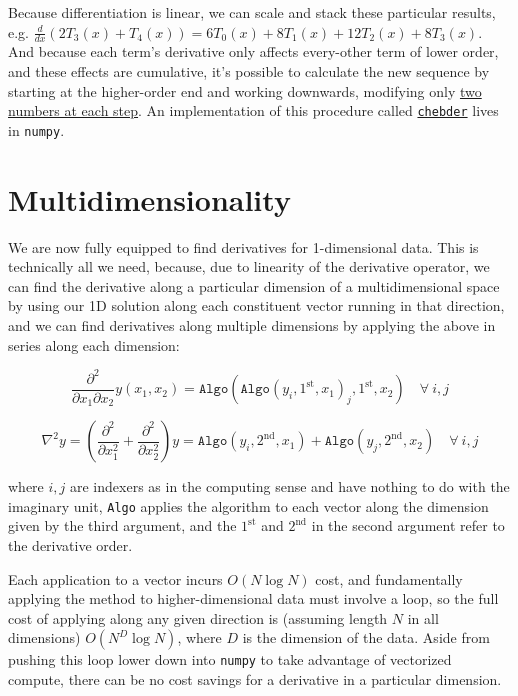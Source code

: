 \documentclass[10pt]{article}
\begin{document}
Because differentiation is linear, we can scale and stack these particular results, e.g. $\frac{d}{dx}(2T_3(x) + T_4(x)) = 6T_0(x) + 8T_1(x) + 12T_2(x) + 8T_3(x)$. And because each term's derivative only affects every-other term of lower order, and these effects are cumulative, it's possible to calculate the new sequence by starting at the higher-order end and working downwards, modifying only \href{https://scicomp.stackexchange.com/q/44939/48402}{two numbers at each step}\cite{dcoefs}. An implementation of this procedure called \href{https://github.com/numpy/numpy/blob/v2.2.0/numpy/polynomial/chebyshev.py#L874-L961}{\texttt{chebder}}\cite{chebder} lives in \texttt{numpy}.


\section{Multidimensionality}

We are now fully equipped to find derivatives for 1-dimensional data. This is technically all we need, because, due to linearity of the derivative operator, we can find the derivative along a particular dimension of a multidimensional space by using our 1D solution along each constituent vector running in that direction, and we can find derivatives along multiple dimensions by applying the above in series along each dimension:

$$\frac{\partial^2}{\partial x_1 \partial x_2} y(x_1, x_2) = \texttt{Algo}(\texttt{Algo}(y_i, 1^\text{st}, x_1)_j, 1^\text{st}, x_2) \quad \forall\ i, j$$

$$ \nabla^2 y = (\frac{\partial^2}{\partial x_1^2} + \frac{\partial^2}{\partial x_2^2}) y = \texttt{Algo}(y_i, 2^\text{nd}, x_1) + \texttt{Algo}(y_j, 2^\text{nd}, x_2) \quad \forall\ i, j$$

\noindent where $i, j$ are indexers as in the computing sense and have nothing to do with the imaginary unit, \texttt{Algo} applies the algorithm to each vector along the dimension given by the third argument, and the $1^\text{st}$ and $2^\text{nd}$ in the second argument refer to the derivative order.

Each application to a vector incurs $O(N \log N)$ cost, and fundamentally applying the method to higher-dimensional data must involve a loop, so the full cost of applying along any given direction is (assuming length $N$ in all dimensions) $O(N^D \log N)$, where $D$ is the dimension of the data. Aside from pushing this loop lower down into \texttt{numpy} to take advantage of vectorized compute, there can be no cost savings for a derivative in a particular dimension.
\end{document}

